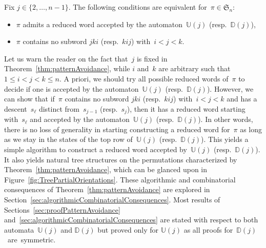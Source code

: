 \documentclass[ALCO]{cedram}
\newcommand{\fS}{\mathfrak{S}}
\newcommand{\automatonU}{\mathbb{U}}
\newcommand{\automatonD}{\mathbb{D}}
\begin{document}
\begin{theorem}\label{thm:patternAvoidance}
Fix $j \in \{2, \dots, n-1\}$.
The following conditions are equivalent for~${\pi \in \fS_n}$:
\begin{itemize}
	\item $\pi$ admits a reduced word accepted by the automaton~$\automatonU(j)$ (resp.~$\automatonD(j)$),
	\item $\pi$ contains no subword $jki$ (resp.~$kij$) with~$i < j < k$.
\end{itemize}
\end{theorem}

Let us warn the reader on the fact that~$j$ is fixed in Theorem~\ref{thm:patternAvoidance}, while $i$ and~$k$ are arbitrary such that~$1 \le i < j < k \le n$.
A priori, we should try all possible reduced words of~$\pi$ to decide if one is accepted by the automaton~$\automatonU(j)$ (resp.~$\automatonD(j)$).
However, we can show that if~$\pi$ contains no subword $jki$ (resp.~$kij$) with~${i < j < k}$ and has a descent~$s_\ell$ distinct from~$s_{j-1}$ (resp.~$s_j$), then it has a reduced word starting with~$s_\ell$ and accepted by the automaton~$\automatonU(j)$ (resp.~$\automatonD(j)$).
In other words, there is no loss of generality in starting constructing a reduced word for~$\pi$ as long as we stay in the states of the top row of~$\automatonU(j)$ (resp.~$\automatonD(j)$).
This yields a simple algorithm to construct a reduced word accepted by~$\automatonU(j)$ (resp.~$\automatonD(j)$).
It also yields natural tree structures on the permutations characterized by Theorem~\ref{thm:patternAvoidance}, which can be glanced upon in Figure~\ref{fig:TreePartialOrientations}.
These algorithmic and combinatorial consequences of Theorem~\ref{thm:patternAvoidance} are explored in Section~\ref{sec:algorithmicCombinatorialConsequences}.
Most results of Sections~\ref{sec:proofPatternAvoidance} and~\ref{sec:algorithmicCombinatorialConsequences} are stated with respect to both automata~$\automatonU(j)$ and $\automatonD(j)$ but proved only for $\automatonU(j)$ as all proofs for~$\automatonD(j)$~are~symmetric.
\end{document}
